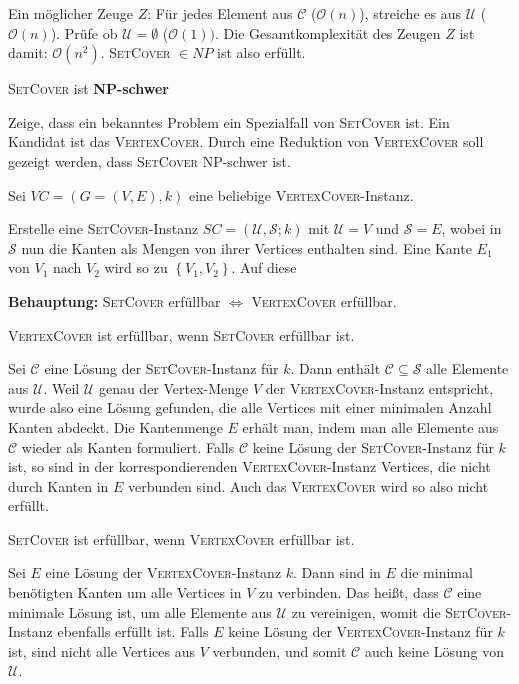 \documentclass{article}
\begin{document}
Ein möglicher Zeuge $Z$: Für jedes Element aus $\mathcal{C}$ ($\mathcal{O}(n)$), streiche es aus $\mathcal{U}$ ($\mathcal{O}(n)$). Prüfe ob $\mathcal{U} = \emptyset$ ($\mathcal{O}(1))$. Die Gesamtkomplexität des Zeugen $Z$ ist damit: $\mathcal{O}(n^2)$. \textsc{SetCover} $\in NP$ ist also erfüllt.

\bigskip

\textsc{SetCover} ist \textbf{NP-schwer}

Zeige, dass ein bekanntes Problem ein Spezialfall von \textsc{SetCover} ist.
Ein Kandidat ist das \textsc{VertexCover}. Durch eine Reduktion von \textsc{VertexCover} soll gezeigt werden, dass \textsc{SetCover} NP-schwer ist.

\smallskip

Sei $VC = (G = (V,E), k)$ eine beliebige \textsc{VertexCover}-Instanz.

Erstelle eine \textsc{SetCover}-Instanz $SC = (\mathcal{U, S};  k)$ mit $\mathcal{U} = V$ und $\mathcal{S} = E$, wobei in $\mathcal{S}$ nun die Kanten als Mengen von ihrer Vertices enthalten sind. Eine Kante $E_1$ von $V_1$ nach $V_2$ wird so zu $\left\{V_1, V_2\right\}$. Auf diese 

\smallskip

\textbf{Behauptung:} \textsc{SetCover} erfüllbar $\Leftrightarrow$ \textsc{VertexCover} erfüllbar.

\smallskip

\textsc{VertexCover} ist erfüllbar, wenn \textsc{SetCover} erfüllbar ist.

Sei $\mathcal{C}$ eine Lösung der \textsc{SetCover}-Instanz für $k$. Dann enthält $\mathcal{C} \subseteq \mathcal{S}$ alle Elemente aus $\mathcal{U}$. Weil $\mathcal{U}$ genau der Vertex-Menge $V$ der \textsc{VertexCover}-Instanz entspricht, wurde also eine Lösung gefunden, die alle Vertices mit einer minimalen Anzahl Kanten abdeckt. Die Kantenmenge $E$ erhält man, indem man alle Elemente aus $\mathcal{C}$ wieder als Kanten formuliert. 
Falls $\mathcal{C}$ keine Lösung der \textsc{SetCover}-Instanz für $k$ ist, so sind in der korrespondierenden \textsc{VertexCover}-Instanz Vertices, die nicht durch Kanten in $E$ verbunden sind. Auch das \textsc{VertexCover} wird so also nicht erfüllt.

\smallskip

\textsc{SetCover} ist erfüllbar, wenn \textsc{VertexCover} erfüllbar ist.

Sei $E$ eine Lösung der \textsc{VertexCover}-Instanz $k$. Dann sind in $E$ die minimal benötigten Kanten um alle Vertices in $V$ zu verbinden. Das heißt, dass $\mathcal{C}$ eine minimale Lösung ist, um alle Elemente aus $\mathcal{U}$ zu vereinigen, womit die \textsc{SetCover}-Instanz ebenfalls erfüllt ist.
Falls $E$ keine Lösung der \textsc{VertexCover}-Instanz für $k$ ist, sind nicht alle Vertices aus $V$ verbunden, und somit $\mathcal{C}$ auch keine Lösung von $\mathcal{U}$.
\end{document}
